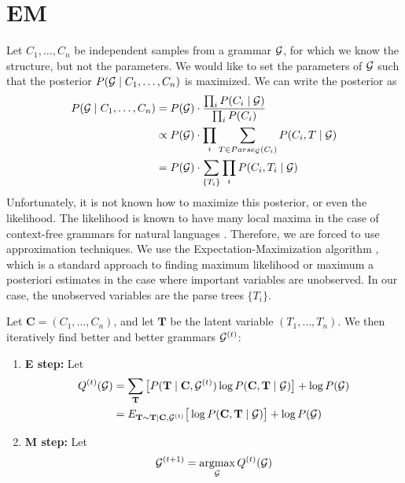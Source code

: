 
\section{EM}


Let $C_1,\dots, C_n$ be independent samples from a grammar ${\mathcal G}$, for
which we know the structure, but not the parameters. We would like to
set the parameters of ${\mathcal G}$ such that the posterior $P({\mathcal G}\mid
C_1,\dots,C_n)$ is maximized. We can write the posterior as
\begin{align*}
  P({\mathcal G}\mid C_1,\dots, C_n) &= P({\mathcal G}) \cdot \frac{\prod_i P(C_i\mid {\mathcal G})}{\prod_i P(C_i)}\\
  &\propto P({\mathcal G}) \cdot \prod_i \sum_{T\in Parse_{{\mathcal G}}(C_i)}P(C_i, T \mid {\mathcal G})\\
  &= P({\mathcal G}) \cdot \sum_{\{T_i\}}\prod_i P(C_i, T_i \mid {\mathcal G})\\
\end{align*}
Unfortunately, it is not known how to maximize this posterior, or even
the likelihood. The likelihood is known to have many local maxima in
the case of context-free grammars for natural languages
\cite{charniak}. Therefore, we are forced to use approximation
techniques. We use the Expectation-Maximization algorithm \cite{em},
which is a standard approach to finding maximum likelihood or maximum
a posteriori estimates in the case where important variables are
unobserved. In our case, the unobserved variables are the parse trees
$\{T_i\}$.

Let $\mathbf{C} = (C_1,\dots,C_n)$, and let $\mathbf{T}$ be the latent
variable $(T_1,\dots,T_n)$. We then iteratively find better and better
grammars ${\mathcal G}^{(t)}$:
\begin{enumerate}
\item \textbf{E step:} Let 
  \begin{align*}
Q^{(t)}({\mathcal G}) &= \sum_{\mathbf{T}} \big[P(\mathbf{T}\mid \mathbf{C},
{\mathcal G}^{(t)}) \log P(\mathbf{C},\mathbf{T}\mid {\mathcal G}) \big] + \log
P({\mathcal G})\\
&= E_{\mathbf{T} \sim \mathbf{T} | \mathbf{C}, {\mathcal G}^{(t)}}\big[\log
P(\mathbf{C},\mathbf{T}\mid {\mathcal G}) \big] + \log P({\mathcal G})
  \end{align*}
\item \textbf{M step:} Let
$$ {\mathcal G}^{(t+1)} = \operatorname*{argmax}_{{\mathcal G}} Q^{(t)}({\mathcal G})$$
\end{enumerate}

